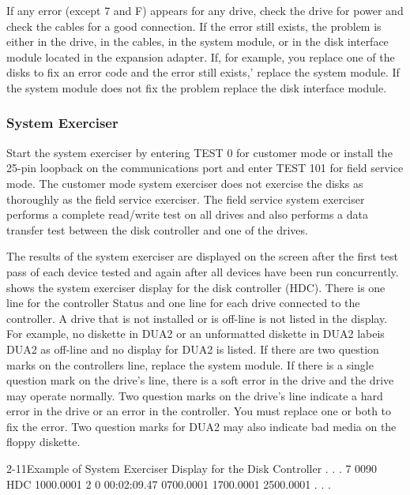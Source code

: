 If any error (except 7 and F) appears for any drive, check the drive for
power and check the cables for a good connection. If the error still exists,
the problem is either in the drive, in the cables, in the system module, or in
the disk interface module located in the expansion adapter. If, for example,
you replace one of the disks to fix an error code and the error still exists,'
replace the system module. If the system module does not fix the problem
replace the disk interface module.

\subsubsection{System Exerciser}

Start the system exerciser by entering TEST 0 for customer mode or install
the 25-pin loopback on the communications port and enter TEST 101 for
field service mode. The customer mode system exerciser does not exercise
the disks as thoroughly as the field service exerciser. The field service
system exerciser performs a complete read/write test on all drives and also
performs a data transfer test between the disk controller and one of the
drives.

The results of the system exerciser are displayed on the screen after the
first test pass of each device tested and again after all devices have been
run concurrently.  shows the system exerciser display for the
disk controller (HDC). There is one line for the controller Status and one
line for each drive connected to the controller. A drive that is not installed
or is off-line is not listed in the display. For example, no diskette in DUA2
or an unformatted diskette in DUA2 labeis DUA2 as off-line and no display
for DUA2 is listed. If there are two question marks on the controllers line,
replace the system module. If there is a single question mark on the drive's
line, there is a soft error in the drive and the drive may operate normally.
Two question marks on the drive's line indicate a hard error in the drive
or an error in the controller. You must replace one or both to fix the error.
Two question marks for DUA2 may also indicate bad media on the floppy
diskette.

\begin{ttfig}{2-11}{Example of System Exerciser Display for the Disk Controller}
.
.
.
7  0090    HDC    1000.0001     2     0 00:02:09.47
                  0700.0001
                  1700.0001
                  2500.0001
.
.
.
\end{ttfig}

